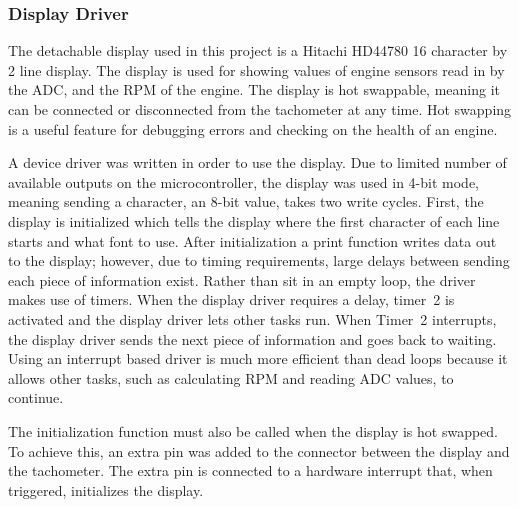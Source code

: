 \subsubsection{Display Driver} %
The detachable display used in this project is a Hitachi HD44780 16 character by 2 line display. The display is used for showing values of engine sensors read in by the ADC, and the RPM of the engine. The display is hot swappable, meaning it can be connected or disconnected from the tachometer at any time. Hot swapping is a useful feature for debugging errors and checking on the health of an engine.

A device driver was written in order to use the display. Due to limited number of available outputs on the microcontroller, the display was used in 4-bit mode, meaning sending a character, an 8-bit value, takes two write cycles. First, the display is initialized which tells the display where the first character of each line starts and what font to use. After initialization a print function writes data out to the display; however, due to timing requirements, large delays between sending each piece of information exist. Rather than sit in an empty loop, the driver makes use of timers. When the display driver requires a delay, timer~2 is activated and the display driver lets other tasks run. When Timer~2 interrupts, the display driver sends the next piece of information and goes back to waiting. Using an interrupt based driver is much more efficient than dead loops because it allows other tasks, such as calculating RPM and reading ADC values, to continue.

The initialization function must also be called when the display is hot swapped. To achieve this, an extra pin was added to the connector between the display and the tachometer. The extra pin is connected to a hardware interrupt that, when triggered, initializes the display.